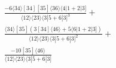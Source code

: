 \documentclass[varwidth, border=5pt]{standalone}
\begin{document}
\begin{my}
$\begin{gathered}
\scriptscriptstyle\frac{-6⟨34⟩[34][35]⟨36⟩⟨4|1+2|3]}{⟨12⟩⟨23⟩⟨3|5+6|3]^3}+\\
\scriptscriptstyle\frac{⟨34⟩[35](3[34]⟨46⟩+5⟨6|1+2|3])}{⟨12⟩⟨23⟩⟨3|5+6|3]^2}+\\
\scriptscriptstyle\frac{-10[35]⟨46⟩}{⟨12⟩⟨23⟩⟨3|5+6|3]}\phantom{+}
\end{gathered}$
\end{my}
\end{document}
